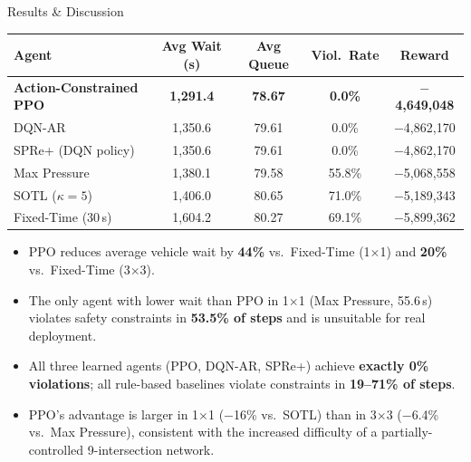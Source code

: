 \documentclass[final,20pt]{beamer}
\newlength{\colwidth}
\begin{document}
\begin{frame}[t]
\begin{columns}[t]
\begin{column}{\colwidth}
\begin{block}{Results \& Discussion}
    \begin{center}
    \begin{tabular}{lcccc}
      \toprule
      \textbf{Agent} & \textbf{Avg Wait (s)} & \textbf{Avg Queue}
                     & \textbf{Viol.\ Rate}  & \textbf{Reward} \\
      \midrule
      \textbf{Action-Constrained PPO} & \textbf{1,291.4} & \textbf{78.67}
                                      & \textbf{0.0\%}   & \textbf{$-$4,649,048} \\
      DQN-AR                          & 1,350.6           & 79.61
                                      & 0.0\%             & $-$4,862,170 \\
      SPRe+ (DQN policy)              & 1,350.6           & 79.61
                                      & 0.0\%             & $-$4,862,170 \\
      Max Pressure                    & 1,380.1           & 79.58
                                      & 55.8\%            & $-$5,068,558 \\
      SOTL ($\kappa\!=\!5$)           & 1,406.0           & 80.65
                                      & 71.0\%            & $-$5,189,343 \\
      Fixed-Time (30\,s)              & 1,604.2           & 80.27
                                      & 69.1\%            & $-$5,899,362 \\
      \bottomrule
    \end{tabular}
    \end{center}

    \vspace{0.8cm}
    \begin{itemize}
      \item PPO reduces average vehicle wait by \textbf{44\%} vs.\ Fixed-Time
        (1$\times$1) and \textbf{20\%} vs.\ Fixed-Time (3$\times$3).
      \item The only agent with lower wait than PPO in 1$\times$1 (Max
        Pressure, 55.6\,s) violates safety constraints in \textbf{53.5\% of
        steps} and is unsuitable for real deployment.
      \item All three learned agents (PPO, DQN-AR, SPRe+) achieve
        \textbf{exactly 0\% violations}; all rule-based baselines violate
        constraints in \textbf{19--71\% of steps}.
      \item PPO's advantage is larger in 1$\times$1 ($-$16\% vs.\ SOTL) than
        in 3$\times$3 ($-$6.4\% vs.\ Max Pressure), consistent with the
        increased difficulty of a partially-controlled 9-intersection network.
    \end{itemize}


\end{block}
\end{column}
\end{columns}
\end{frame}
\end{document}
